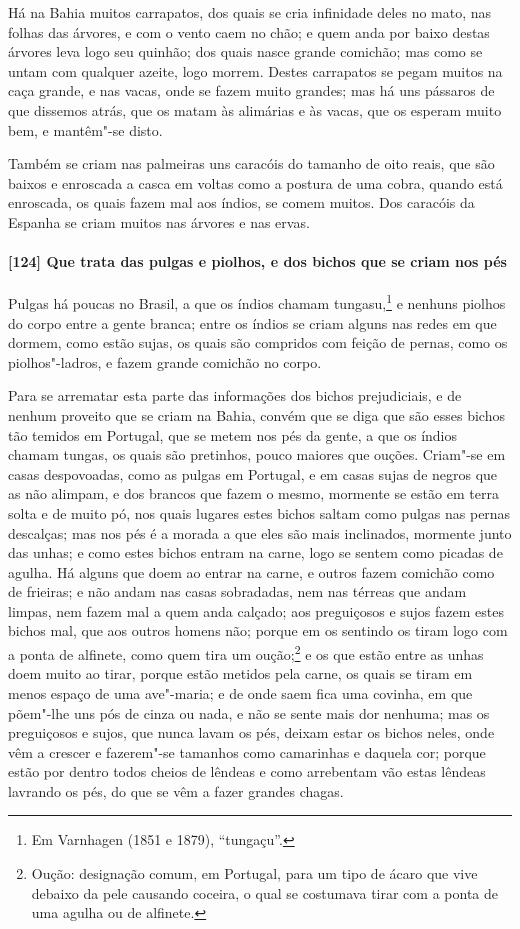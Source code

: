Há na Bahia muitos carrapatos, dos quais se cria infinidade deles no mato, nas folhas das
árvores, e com o vento caem no chão; e quem anda por baixo destas árvores leva logo seu
quinhão; dos quais nasce grande comichão; mas como se untam com qualquer azeite, logo
morrem. Destes carrapatos se pegam muitos na caça grande, e nas vacas, onde se fazem muito
grandes; mas há uns pássaros de que dissemos atrás, que os matam às alimárias e às vacas,
que os esperam muito bem, e mantêm"-se disto.

Também se criam nas palmeiras uns caracóis do tamanho de oito reais, que são baixos e
enroscada a casca em voltas como a postura de uma cobra, quando está enroscada, os quais
fazem mal aos índios, se comem muitos. Dos caracóis da Espanha se criam muitos nas árvores
e nas ervas.

\paragraph{[124] Que trata das pulgas e piolhos, e dos bichos que se criam nos pés}\quad
Pulgas há poucas no Brasil, a que os índios chamam tungasu,\footnote{ Em Varnhagen (1851 e
1879), ``tungaçu''.} e nenhuns piolhos do corpo entre a gente branca; entre os índios se
criam alguns nas redes em que dormem, como estão sujas, os quais são compridos com feição
de pernas, como os piolhos"-ladros, e fazem grande comichão no corpo.

Para se arrematar esta parte das informações dos bichos prejudiciais, e de nenhum proveito
que se criam na Bahia, convém que se diga que são esses bichos tão temidos em Portugal,
que se metem nos pés da gente, a que os índios chamam tungas, os quais são pretinhos,
pouco maiores que ouções. Criam"-se em casas despovoadas, como as pulgas em Portugal, e em
casas sujas de negros que as não alimpam, e dos brancos que fazem o mesmo, mormente se
estão em terra solta e de muito pó, nos quais lugares estes bichos saltam como pulgas nas
pernas descalças; mas nos pés é a morada a que eles são mais inclinados, mormente junto
das unhas; e como estes bichos entram na carne, logo se sentem como picadas de agulha. Há
alguns que doem ao entrar na carne, e outros fazem comichão como de frieiras; e não andam
nas casas sobradadas, nem nas térreas que andam limpas, nem fazem mal a quem anda calçado;
aos preguiçosos e sujos fazem estes bichos mal, que aos outros homens não; porque em os
sentindo os tiram logo com a ponta de alfinete, como quem tira um oução;\footnote{ Oução:
designação comum, em Portugal, para um tipo de ácaro que vive debaixo da pele causando
coceira, o qual se costumava tirar com a ponta de uma agulha ou de alfinete.} e os que
estão entre as unhas doem muito ao tirar, porque estão metidos pela carne, os quais se
tiram em menos espaço de uma ave"-maria; e de onde saem fica uma covinha, em que põem"-lhe
uns pós de cinza ou nada, e não se sente mais dor nenhuma; mas os preguiçosos e sujos, que
nunca lavam os pés, deixam estar os bichos neles, onde vêm a crescer e fazerem"-se tamanhos
como camarinhas e daquela cor; porque estão por dentro todos cheios de lêndeas e como
arrebentam vão estas lêndeas lavrando os pés, do que se vêm a fazer grandes chagas.

